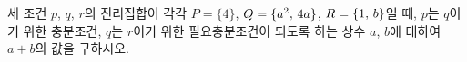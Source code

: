 세 조건 $p$, $q$, $r$의 진리집합이 각각 $P=\{4\}$, $Q=\{a^2,\mkern3mu 4a\}$, $R=\{1,\mkern3mu b\}$일 때, $p$는 $q$이기 위한 충분조건, $q$는 $r$이기 위한 필요충분조건이 되도록 하는 상수 $a$, $b$에 대하여 $a+b$의 값을 구하시오.
